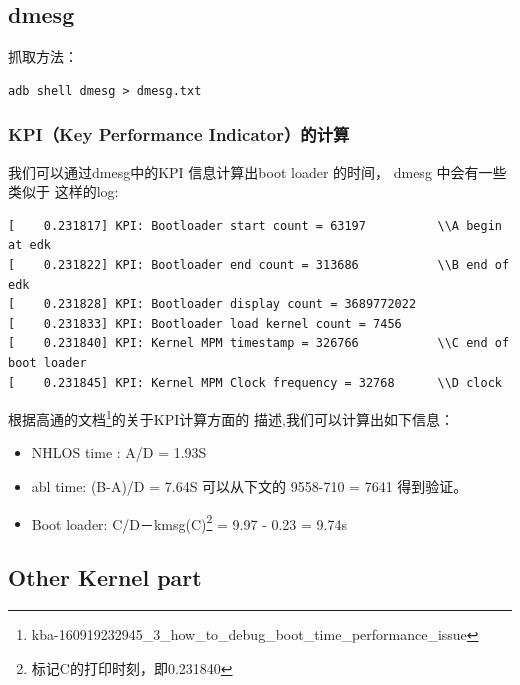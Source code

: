 \subsection{dmesg}

抓取方法：
\begin{lstlisting}
adb shell dmesg > dmesg.txt
\end{lstlisting}


\subsubsection{KPI（Key Performance Indicator）的计算}

我们可以通过dmesg中的KPI 信息计算出boot loader 的时间，
dmesg 中会有一些类似于 这样的log:
\begin{lstlisting}
[    0.231817] KPI: Bootloader start count = 63197 			\\A begin at edk
[    0.231822] KPI: Bootloader end count = 313686  			\\B end of edk
[    0.231828] KPI: Bootloader display count = 3689772022
[    0.231833] KPI: Bootloader load kernel count = 7456
[    0.231840] KPI: Kernel MPM timestamp = 326766			\\C end of boot loader
[    0.231845] KPI: Kernel MPM Clock frequency = 32768		\\D clock
\end{lstlisting}

根据高通的文档\footnote{kba-160919232945\_3\_how\_to\_debug\_boot\_time\_performance\_issue}的关于KPI计算方面的
描述,我们可以计算出如下信息：

\begin{itemize}

\item NHLOS time : A/D = 1.93S

\item abl time: (B-A)/D = 7.64S	可以从下文的 9558-710 = 7641 得到验证。

\item Boot loader: C/D－kmsg(C)\footnote{标记C的打印时刻，即0.231840} = 9.97 - 0.23 = 9.74s

\end{itemize}








\subsection{Other Kernel part}

